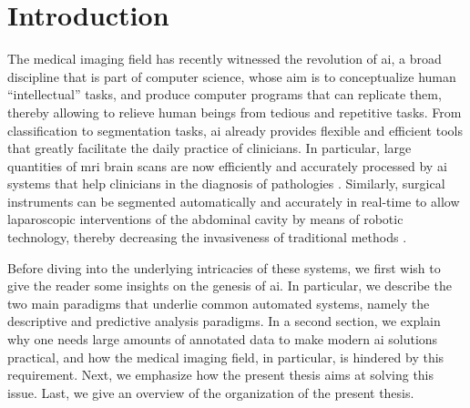 \glsresetall

\chapter{Introduction}
\label{intro}

The medical imaging field has recently witnessed the revolution of \gls{ai}, a broad discipline that is part of computer science, whose aim is to conceptualize human ``intellectual'' tasks, and produce computer programs that can replicate them, thereby allowing to relieve human beings from tedious and repetitive tasks.
From classification to segmentation tasks, \gls{ai} already provides flexible and efficient tools that greatly facilitate the daily practice of clinicians.
In particular, large quantities of \gls{mri} brain scans are now efficiently and accurately processed by \gls{ai} systems that help clinicians in the diagnosis of pathologies \cite{sun19}.
Similarly, surgical instruments can be segmented automatically and accurately in real-time to allow laparoscopic interventions of the abdominal cavity by means of robotic technology, thereby decreasing the invasiveness of traditional methods \cite{davinci}.

Before diving into the underlying intricacies of these systems, we
first wish to give the reader some insights on the genesis of \gls{ai}.
In particular, we describe the two main paradigms that underlie common automated systems, namely the descriptive and predictive analysis paradigms.
In a second section, we explain why one needs large amounts of annotated data to make modern \gls{ai} solutions practical, and how the medical imaging field, in particular, is hindered by this requirement.
Next, we emphasize how the present thesis aims at solving this issue.
Last, we give an overview of the organization of the present thesis.

